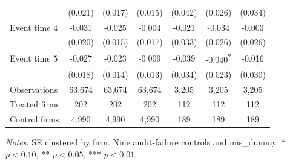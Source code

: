 \documentclass[10pt]{article}
\newcommand{\sym}[1]{\textsuperscript{#1}}
\begin{document}
\begin{minipage}{19cm}
\begin{threeparttable}
\begin{tabular}{l c c c c c c }
 & (0.021) & (0.017) & (0.015) & (0.042) & (0.026) & (0.034) \\
Event time $4$ & -0.031 & -0.025 & -0.004 & -0.021 & -0.034 & -0.003 \\
 & (0.020) & (0.015) & (0.017) & (0.033) & (0.026) & (0.026) \\
Event time $5$ & -0.027 & -0.023 & -0.009 & -0.039 & -0.040\sym{*} & -0.016 \\
 & (0.018) & (0.014) & (0.013) & (0.034) & (0.023) & (0.030) \\
\midrule
Observations & 63,674 & 63,674 & 63,674 & 3,205 & 3,205 & 3,205 \\
Treated firms & 202 & 202 & 202 & 112 & 112 & 112 \\
Control firms & 4,990 & 4,990 & 4,990 & 189 & 189 & 189 \\
\bottomrule
\end{tabular}
\begin{tablenotes}\fontsize{9}{11}\selectfont
\item \raggedright \fontsize{9}{11}\selectfont \textit{Notes:} SE clustered by firm. Nine audit-failure controls and mis\_dummy. * $p<0.10$, ** $p<0.05$, *** $p<0.01$.
\end{tablenotes}
\end{threeparttable}

\end{minipage}
\end{document}
